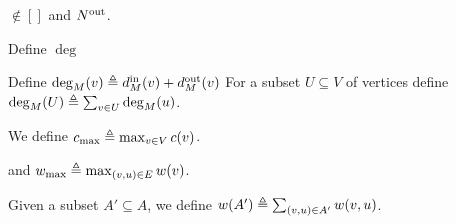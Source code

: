 

$\nin[]$ and $\nout[]$.



Define $\deg$

Define $\deg_M(v) \eqdf \din[M](v) + \dout[M](v)$
%
For a subset $U \subseteq V$ of vertices define
$\deg_M(U) \eqdf \sum_{v \in U} \deg_M(u)$.


We define $c_{\max} \eqdf \max_{v \in V} c(v)$.

and $w_{\max} \eqdf \max_{(v,u) \in E} w(v)$.

Given a subset $A' \subseteq A$, we define
$w(A') \eqdf \sum_{(v,u) \in A'} w(v,u)$.


